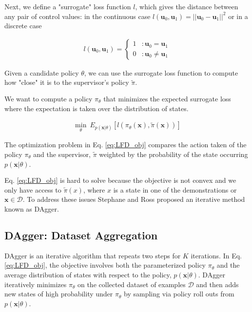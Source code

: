 \documentclass[10pt, conference]{ieeeconf}      %
\newcommand{\bu}{\mathbf{u}}
\newcommand{\bx}{\mathbf{x}}
\begin{document}
Next, we define a "surrogate" loss function $l$, which gives the distance between any pair of control values: in the continuous case $l(\bu_0,\bu_1) = ||\bu_0-\bu_1||^2$ or in a discrete case

 \vspace{-2ex}
\begin{align}
 l(\bu_0,\bu_1) = \left\{
     \begin{array}{lr}
       1 & : \bu_0 = \bu_1\\
       0 & : \bu_0 \neq \bu_1
     \end{array}
   \right.
\end{align}

Given a candidate policy $\theta$, we can use the surrogate loss function to compute how "close" it is to the supervisor's policy $\tilde{\pi}$. 

We want to compute a policy $\pi_{\theta}$ that minimizes the expected surrogate loss where the expectation is taken over the distribution of states. 

 \vspace{-2ex}
\begin{align}\label{eq:LFD_obj}
\underset{\theta}{\min} \: E_{p(\bx|\theta)} [l(\pi_\theta(\bx),\tilde{\pi}(\bx))]
\end{align}
 
 
 
 
The optimization problem in Eq. \ref{eq:LFD_obj} compares the action taken of the policy $\pi_\theta$ and  the supervisor, $\tilde{\pi}$  weighted by the probability of  the state occurring $p(\bx|\theta)$. 

Eq. \ref{eq:LFD_obj} is hard to solve because  the objective is not convex and we only have access to $\tilde{\pi}(x)$, where $x$ is a state in one of the demonstrations or $\bx \in \mathcal{D}$. To address these issues Stephane and Ross proposed an iterative method known as DAgger\cite{ross2010reduction}.






 \subsection{DAgger: Dataset Aggregation}
 DAgger is an iterative algorithm that repeats two steps for $K$ iterations. 
 In Eq. \ref{eq:LFD_obj}, the objective involves both the parameterized policy $\pi_{\theta}$ and the average distribution of states with respect to the policy, $p(\bx|\theta)$. DAgger iteratively minimizes $\pi_{\theta}$ on the collected dataset of examples $\mathcal{D}$ and then adds new states of high probability under $\pi_\theta$ by sampling via policy roll outs from $p(\bx|\theta)$. 
\end{document}
